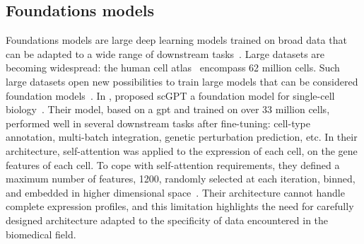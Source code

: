 \documentclass[../main.tex]{subfiles}
\begin{document}
	\subsection{Foundations models}
		Foundations models are large deep learning models trained on broad data that can be adapted to a wide range of downstream tasks~\cite{bommasani2022opportunitiesrisksfoundationmodels}.
		Large  datasets are becoming widespread: the human cell atlas~\cite{Regev2017} encompass 62 million cells.
		Such large datasets open new possibilities to train large models that can be considered foundation models~\cite{Moor2023}.
		In \citeyear{Cui2024}, \citeauthor{Cui2024} proposed scGPT a foundation model for single-cell biology~\cite{Cui2024}.
		Their model, based on a \gls{gpt} and trained on over 33 million cells, performed well in several downstream tasks after fine-tuning: cell-type annotation, multi-batch integration, genetic perturbation prediction, etc\@.
		In their architecture, self-attention was applied to the expression of each cell, \ie{}on the gene features of each cell.
		To cope with self-attention requirements, they defined a maximum number of features, 1200, randomly selected at each iteration, binned, and embedded in higher dimensional space~\cite{Cui2024}.
		Their architecture cannot handle complete expression profiles, and this limitation highlights the need for carefully designed architecture adapted to the specificity of data encountered in the biomedical field.
\end{document}
